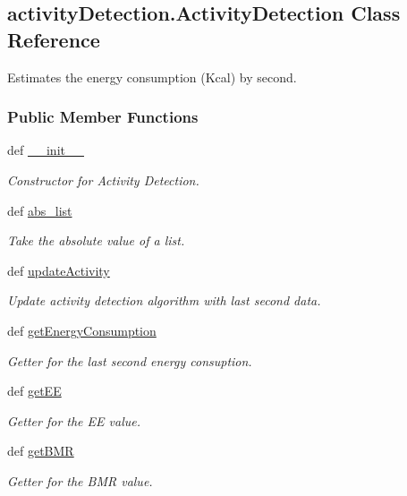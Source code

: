 \hypertarget{classactivity_detection_1_1_activity_detection}{\subsection{activity\-Detection.\-Activity\-Detection Class Reference}
\label{classactivity_detection_1_1_activity_detection}
}


Estimates the energy consumption (Kcal) by second.  


\subsubsection*{Public Member Functions}
\begin{DoxyCompactItemize}
\item 
def \hyperlink{classactivity_detection_1_1_activity_detection_a928cf245f832e26577625232d0803a47}{\-\_\-\-\_\-init\-\_\-\-\_\-}
\begin{DoxyCompactList}\small\item\em Constructor for Activity Detection. \end{DoxyCompactList}\item 
def \hyperlink{classactivity_detection_1_1_activity_detection_a65ceffc34852f2debf600096301d6217}{abs\-\_\-list}
\begin{DoxyCompactList}\small\item\em Take the absolute value of a list. \end{DoxyCompactList}\item 
def \hyperlink{classactivity_detection_1_1_activity_detection_a25c0d2b32a72ac5be756a5fd74ee0c4c}{update\-Activity}
\begin{DoxyCompactList}\small\item\em Update activity detection algorithm with last second data. \end{DoxyCompactList}\item 
def \hyperlink{classactivity_detection_1_1_activity_detection_aaedeb86760c2edb29274956e53240ecc}{get\-Energy\-Consumption}
\begin{DoxyCompactList}\small\item\em Getter for the last second energy consuption. \end{DoxyCompactList}\item 
def \hyperlink{classactivity_detection_1_1_activity_detection_a104e51a618c579e321f6a71f1e05cb87}{get\-E\-E}
\begin{DoxyCompactList}\small\item\em Getter for the E\-E value. \end{DoxyCompactList}\item 
def \hyperlink{classactivity_detection_1_1_activity_detection_a8dd2cc520a000ca555f8a478e11ffaf7}{get\-B\-M\-R}
\begin{DoxyCompactList}\small\item\em Getter for the B\-M\-R value. \end{DoxyCompactList}\end{DoxyCompactItemize}
